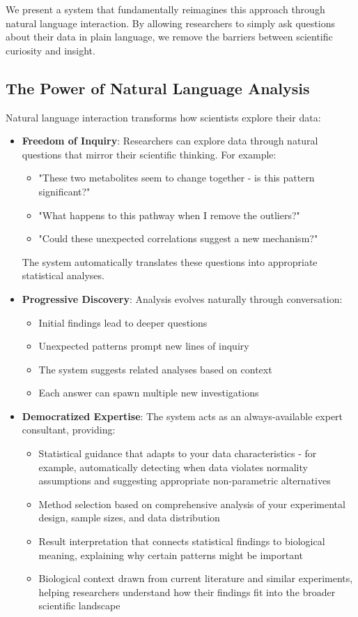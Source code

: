 \documentclass[11pt,a4paper]{article}
\begin{document}
We present a system that fundamentally reimagines this approach through natural language interaction. By allowing researchers to simply ask questions about their data in plain language, we remove the barriers between scientific curiosity and insight.

\subsection{The Power of Natural Language Analysis}
Natural language interaction transforms how scientists explore their data:

\begin{itemize}
    \item \textbf{Freedom of Inquiry}: Researchers can explore data through natural questions that mirror their scientific thinking. For example:
    \begin{itemize}
        \item "These two metabolites seem to change together - is this pattern significant?"
        \item "What happens to this pathway when I remove the outliers?"
        \item "Could these unexpected correlations suggest a new mechanism?"
    \end{itemize}
    The system automatically translates these questions into appropriate statistical analyses.
    
    \item \textbf{Progressive Discovery}: Analysis evolves naturally through conversation:
    \begin{itemize}
        \item Initial findings lead to deeper questions
        \item Unexpected patterns prompt new lines of inquiry
        \item The system suggests related analyses based on context
        \item Each answer can spawn multiple new investigations
    \end{itemize}
    
    \item \textbf{Democratized Expertise}: The system acts as an always-available expert consultant, providing:
    \begin{itemize}
        \item Statistical guidance that adapts to your data characteristics - for example, automatically detecting when data violates normality assumptions and suggesting appropriate non-parametric alternatives
        \item Method selection based on comprehensive analysis of your experimental design, sample sizes, and data distribution
        \item Result interpretation that connects statistical findings to biological meaning, explaining why certain patterns might be important
        \item Biological context drawn from current literature and similar experiments, helping researchers understand how their findings fit into the broader scientific landscape
    \end{itemize}
    

\end{itemize}
\end{document}
